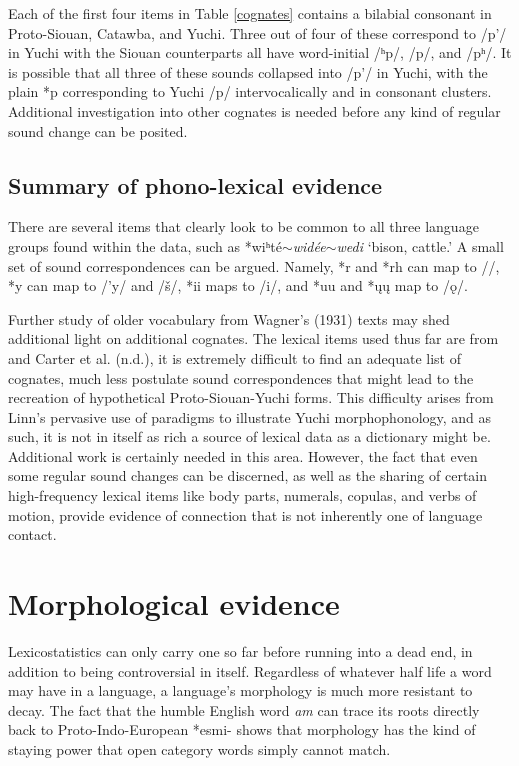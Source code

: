 \documentclass[output=paper]{LSP/langsci}
\begin{document}
{Each of the first four items in Table \ref{cognates} contains a bilabial consonant in Proto-Siouan, Catawba, and Yuchi. Three out of four of these correspond to /p'/ in Yuchi with the Siouan counterparts all have word-initial /ʰp/, /p/, and /pʰ/. It is possible that all three of these sounds collapsed into /p'/ in Yuchi, with the plain *p corresponding to Yuchi /p/ intervocalically and in consonant clusters. Additional investigation into other cognates is needed before any kind of regular sound change can be posited.

\subsection{Summary of phono-lexical evidence}

There are several items that clearly look to be common to all three language groups found within the data, such as *wiʰt\'e$\sim$\emph{wid\'ee}$\sim$\emph{wedi} `bison, cattle.' A small set of sound correspondences can be argued. Namely, *r and *rh can map to /\textbeltl/, *y can map to /'y/ and /\v{s}/, *ii maps to /i/, and *uu and *\k{u}\k{u} map to /\k{o}/. 

Further study of older vocabulary from Wagner's (1931) texts may shed additional light on additional cognates. The lexical items used thus far are from \citet{Linn2000} and Carter et al. (n.d.), it is extremely difficult to find an adequate list of cognates, much less postulate sound correspondences that might lead to the recreation of hypothetical Proto-Siouan-Yuchi forms. This difficulty arises from Linn's pervasive use of paradigms to illustrate Yuchi morphophonology, and as such, it is not in itself as rich a source of lexical data as a dictionary might be. Additional work is certainly needed in this area. However, the fact that even some regular sound changes can be discerned, as well as the sharing of certain high-frequency lexical items like body parts, numerals, copulas, and verbs of motion, provide evidence of connection that is not inherently one of language contact.

\section{Morphological evidence}

Lexicostatistics can only carry one so far before running into a dead end, in addition to being controversial in itself. Regardless of whatever half life a word may have in a language, a language's morphology is much more resistant to decay. The fact that the humble English word \textit{am} can trace its roots directly back to Proto-Indo-European *esmi- shows that morphology has the kind of staying power that open category words simply cannot match.

}
\end{document}
